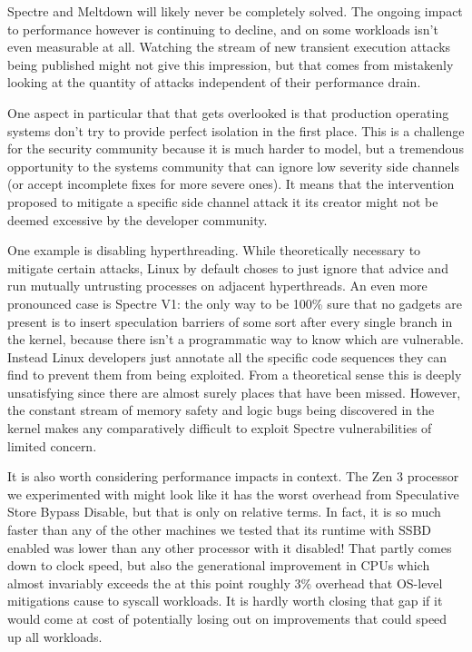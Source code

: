Spectre and Meltdown will likely never be completely solved.
The ongoing impact to performance however is continuing to decline, and on some workloads isn't even measurable at all.
Watching the stream of new transient execution attacks being published might not give this impression, but that comes from mistakenly looking at the quantity of attacks independent of their performance drain.

One aspect in particular that that gets overlooked is that production operating systems don't try to provide perfect isolation in the first place.
This is a challenge for the security community because it is much harder to model, but a tremendous opportunity to the systems community that can ignore low severity side channels (or accept incomplete fixes for more severe ones).
It means that the intervention proposed to mitigate a specific side channel attack it its creator might not be deemed excessive by the developer community.

One example is disabling hyperthreading.
While theoretically necessary to mitigate certain attacks, Linux by default choses to just ignore that advice and run mutually untrusting processes on adjacent hyperthreads.
An even more pronounced case is Spectre V1: the only way to be 100\% sure that no gadgets are present is to insert speculation barriers of some sort after every single branch in the kernel, because there isn't a programmatic way to know which are vulnerable.
Instead Linux developers just annotate all the specific code sequences they can find to prevent them from being exploited.
From a theoretical sense this is deeply unsatisfying since there are almost surely places that have been missed.
However, the constant stream of memory safety and logic bugs being discovered in the kernel makes any comparatively difficult to exploit Spectre vulnerabilities of limited concern.

It is also worth considering performance impacts in context.
The Zen 3 processor we experimented with might look like it has the worst overhead from Speculative Store Bypass Disable, but that is only on relative terms.
In fact, it is so much faster than any of the other machines we tested that its runtime with SSBD enabled was lower than any other processor with it disabled!
That partly comes down to clock speed, but also the generational improvement in CPUs which almost invariably exceeds the at this point roughly 3\% overhead that OS-level mitigations cause to syscall workloads.
It is hardly worth closing that gap if it would come at cost of potentially losing out on improvements that could speed up all workloads.


